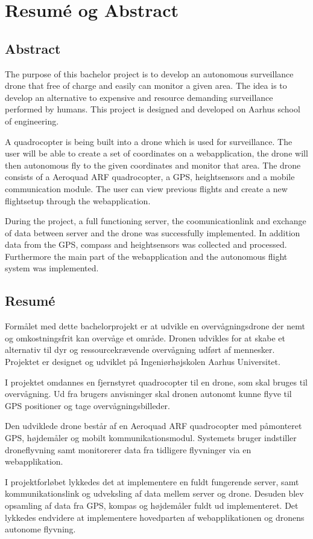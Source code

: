 \chapter{Resumé og Abstract}
\label{chap:resume}


\section*{Abstract}

The purpose of this bachelor project is to develop an autonomous surveillance drone that free of charge and easily can monitor a given area. The idea is to develop an alternative to expensive and resource demanding surveillance performed by humans. This project is designed and developed on Aarhus school of engineering. 

A quadrocopter is being built into a drone which is used for surveillance. The user will be able to create a set of coordinates on a webapplication, the drone will then autonomous fly to the given coordinates and monitor that area. 
The drone consists of a Aeroquad ARF quadrocopter, a GPS, heightsensors and a mobile communication module. 
The user can view previous flights and create a new flightsetup through the webapplication.

During the project, a full functioning server, the coomunicationlink and exchange of data between server and the drone was successfully implemented. In addition data from the GPS, compass and heightsensors was collected and processed. Furthermore the main part of the webapplication and the autonomous flight system was implemented.




\section*{Resumé}

Formålet med dette bachelorprojekt er at udvikle en overvågningsdrone der nemt og omkostningsfrit kan overvåge et område. Dronen udvikles for at skabe et alternativ til dyr og ressourcekrævende overvågning udført af mennesker.
Projektet er designet og udviklet på Ingeniørhøjskolen Aarhus Universitet.

I projektet omdannes en fjernstyret quadrocopter til en drone, som skal bruges til overvågning. Ud fra brugers anvisninger skal dronen autonomt kunne flyve til GPS positioner og tage overvågningsbilleder.  

Den udviklede drone består af en Aeroquad ARF quadrocopter med påmonteret GPS, højdemåler og mobilt kommunikationsmodul. Systemets bruger indstiller droneflyvning samt monitorerer data fra tidligere flyvninger via en webapplikation.  

I projektforløbet lykkedes det at implementere en fuldt fungerende server, samt kommunikationslink og udveksling af data mellem server og drone. Desuden blev opsamling af data fra GPS, kompas og højdemåler fuldt ud implementeret. Det lykkedes endvidere at implementere hovedparten af webapplikationen og dronens autonome flyvning.





